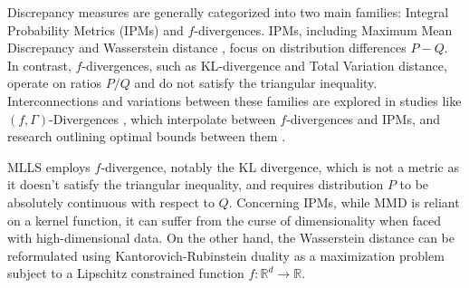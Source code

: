 Discrepancy measures are generally categorized into two main families: Integral Probability Metrics (IPMs) and \(f\)-divergences. IPMs, including Maximum Mean Discrepancy \citep{MMD} and Wasserstein distance \citep{wasserstein}, focus on distribution differences \(P - Q\). In contrast, \(f\)-divergences, such as KL-divergence \citep{KL} and Total Variation distance, operate on ratios \({P}/{Q}\) and do not satisfy the triangular inequality. Interconnections and variations between these families are explored in studies like \((f, \Gamma)\)-Divergences \citep{article_f}, which interpolate between \(f\)-divergences and IPMs, and research outlining optimal bounds between them \citep{article_f2}. 

MLLS \citep{mlls} employs \( f \)-divergence, notably the KL divergence, which is not a metric as it doesn't satisfy the triangular inequality, and requires distribution \( P \) to be absolutely continuous with respect to \( Q \). Concerning IPMs, while MMD is reliant on a kernel function, it can suffer from the curse of dimensionality when faced with high-dimensional data. On the other hand, the Wasserstein distance can be reformulated using Kantorovich-Rubinstein duality \citep{rubinstein, wgan} as a maximization problem subject to a Lipschitz constrained function \( f: \mathbb{R}^d \rightarrow \mathbb{R} \). 

